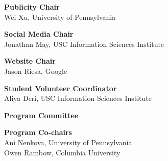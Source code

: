 {\bf Publicity Chair}\\
Wei Xu, University of Pennsylvania

{\bf Social Media Chair}\\
Jonathan May, USC Information Sciences Institute

{\bf Website Chair}\\
Jason Riesa, Google

{\bf Student Volunteer Coordinator} \\
Aliya Deri, USC Information Sciences Institute


\newpage

\begin{center}
  {\Large \bf Program Committee}
\end{center}

\vspace*{0.5cm}


{\bf Program Co-chairs} \\
Ani Nenkova, University of Pennsylvania \\
Owen Rambow, Columbia University

